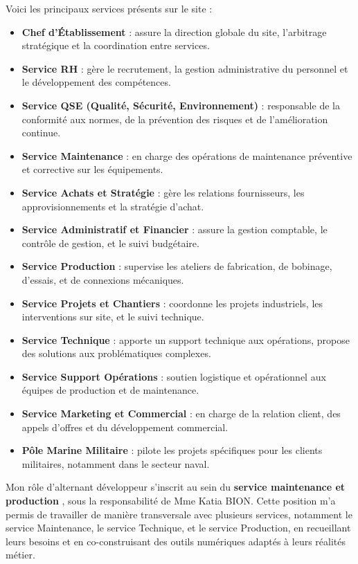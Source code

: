 \documentclass[11pt,a4paper]{article}
\begin{document}
Voici les principaux services présents sur le site :

\begin{itemize}
    \item \textbf{Chef d’Établissement} : assure la direction globale du site, l’arbitrage stratégique et la coordination entre services.

    \item \textbf{Service RH} : gère le recrutement, la gestion administrative du personnel et le développement des compétences.
    \item \textbf{Service QSE (Qualité, Sécurité, Environnement)} : responsable de la conformité aux normes, de la prévention des risques et de l'amélioration continue.
    \item \textbf{Service Maintenance} : en charge des opérations de maintenance préventive et corrective sur les équipements.
    \item \textbf{Service Achats et Stratégie} : gère les relations fournisseurs, les approvisionnements et la stratégie d'achat.
    \item \textbf{Service Administratif et Financier} : assure la gestion comptable, le contrôle de gestion, et le suivi budgétaire.
    \item \textbf{Service Production} : supervise les ateliers de fabrication, de bobinage, d’essais, et de connexions mécaniques.
    \item \textbf{Service Projets et Chantiers} : coordonne les projets industriels, les interventions sur site, et le suivi technique.
    \item \textbf{Service Technique} : apporte un support technique aux opérations, propose des solutions aux problématiques complexes.
    \item \textbf{Service Support Opérations} : soutien logistique et opérationnel aux équipes de production et de maintenance.
    \item \textbf{Service Marketing et Commercial} : en charge de la relation client, des appels d’offres et du développement commercial.
    \item \textbf{Pôle Marine Militaire} : pilote les projets spécifiques pour les clients militaires, notamment dans le secteur naval.
\end{itemize}

Mon rôle d’alternant développeur s’inscrit au sein du \textbf{service maintenance et production }, sous la responsabilité de Mme Katia BION. Cette position m’a permis de travailler de manière transversale avec plusieurs services, notamment le service Maintenance, le service Technique, et le service Production, en recueillant leurs besoins et en co-construisant des outils numériques adaptés à leurs réalités métier.
\end{document}
